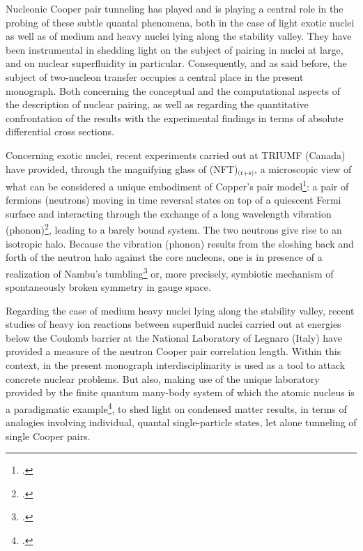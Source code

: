   
 Nucleonic Cooper pair tunneling has played and is playing a central role in the probing of these subtle quantal phenomena, both in the case of  light exotic nuclei as well as of medium and heavy nuclei lying along the stability valley. They  have been instrumental in shedding light on the subject of pairing in nuclei at large, and on nuclear superfluidity in particular. Consequently, and as said before, the subject of two-nucleon transfer occupies  a central place in the present monograph. Both concerning the conceptual and the computational aspects of the description of nuclear pairing, as well as regarding the quantitative confrontation of the results  with the experimental findings in terms of absolute differential cross sections.

Concerning exotic nuclei, recent experiments carried out at TRIUMF (Canada) have provided, through the magnifying glass of (NFT)$_\text{(r+s)}$, a microscopic view of what can be considered a unique embodiment of Copper's pair model\footnote{\cite{Cooper:56}.}: a pair of fermions (neutrons) moving in time reversal states on top of a quiescent Fermi surface and interacting through the exchange of a long wavelength vibration (phonon)\footnote{\cite{Frohlich:52,Bardeen:55,Bardeen:57a,Bardeen:57b}.}, leading to a barely bound system. The two neutrons give rise to an isotropic halo. Because the vibration (phonon) results from the sloshing back and forth of the neutron halo against the core nucleons, one is in presence of a realization of Nambu's tumbling\footnote{\cite{Nambu:91}.} or, more precisely, symbiotic mechanism of spontaneously broken symmetry in gauge space.

Regarding the case of medium heavy nuclei lying along the stability valley, recent studies of heavy ion reactions between superfluid nuclei carried out at energies below the Coulomb barrier at the National Laboratory of Legnaro (Italy) have provided a measure of the neutron Cooper pair correlation length. Within this context, in the present monograph interdisciplinarity is used as a tool to attack concrete nuclear problems. But also, making use of the unique laboratory provided by the finite quantum many-body system of which the atomic nucleus is a paradigmatic example\footnote{\cite{Bohr:19}.}, to shed light on condensed matter results, in terms of analogies involving individual, quantal single-particle states, let alone tunneling of single Cooper pairs.



